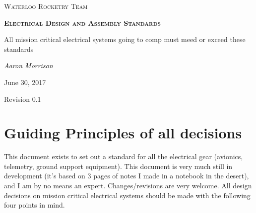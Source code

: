 \documentclass{article}
\begin{document}
\begin{titlepage}
	\centering
	{\scshape\Huge Waterloo Rocketry Team \par}
	\vspace{1.5cm}
	{\scshape\bfseries\LARGE Electrical Design and Assembly Standards\par}
	\vspace{0.5cm}
	{\large All mission critical electrical systems going to comp must meed or exceed these standards\par}
	\vspace{2cm}
	{\Large\itshape Aaron Morrison\par}
	\vfill

	{\large June 30, 2017\par Revision 0.1}
    \par
\end{titlepage}

\section{Guiding Principles of all decisions}
This document exists to set out a standard for all the electrical gear (avionics, telemetry, ground support equipment). This document is very much still in development (it's based on 3 pages of notes I made in a notebook in the desert), and I am by no means an expert. Changes/revisions are very welcome. All design decisions on mission critical electrical systems should be made with the following four points in mind.
\end{document}
